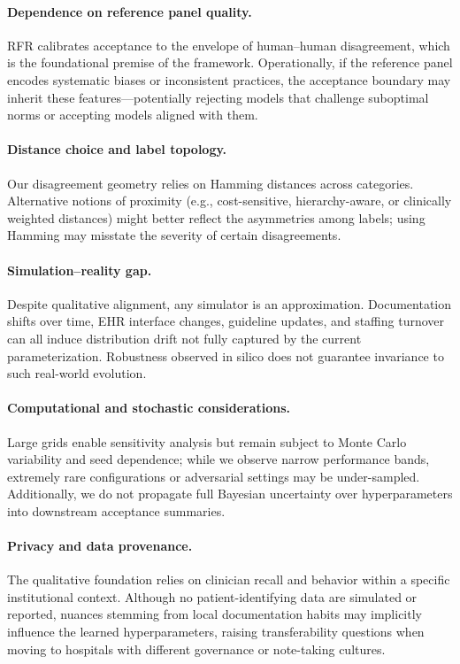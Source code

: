 \documentclass[12pt]{article}
\begin{document}
\paragraph{Dependence on reference panel quality.}
RFR calibrates acceptance to the envelope of human–human disagreement, which is the foundational premise of the framework. Operationally, if the reference panel encodes systematic biases or inconsistent practices, the acceptance boundary may inherit these features—potentially rejecting models that challenge suboptimal norms or accepting models aligned with them.

\paragraph{Distance choice and label topology.}
Our disagreement geometry relies on Hamming distances across categories. Alternative notions of proximity (e.g., cost-sensitive, hierarchy-aware, or clinically weighted distances) might better reflect the asymmetries among labels; using Hamming may misstate the severity of certain disagreements.

\paragraph{Simulation–reality gap.}
Despite qualitative alignment, any simulator is an approximation. Documentation shifts over time, EHR interface changes, guideline updates, and staffing turnover can all induce distribution drift not fully captured by the current parameterization. Robustness observed in silico does not guarantee invariance to such real-world evolution.

\paragraph{Computational and stochastic considerations.}
Large grids enable sensitivity analysis but remain subject to Monte Carlo variability and seed dependence; while we observe narrow performance bands, extremely rare configurations or adversarial settings may be under-sampled. Additionally, we do not propagate full Bayesian uncertainty over hyperparameters into downstream acceptance summaries.

\paragraph{Privacy and data provenance.}
The qualitative foundation relies on clinician recall and behavior within a specific institutional context. Although no patient-identifying data are simulated or reported, nuances stemming from local documentation habits may implicitly influence the learned hyperparameters, raising transferability questions when moving to hospitals with different governance or note-taking cultures.
\end{document}
